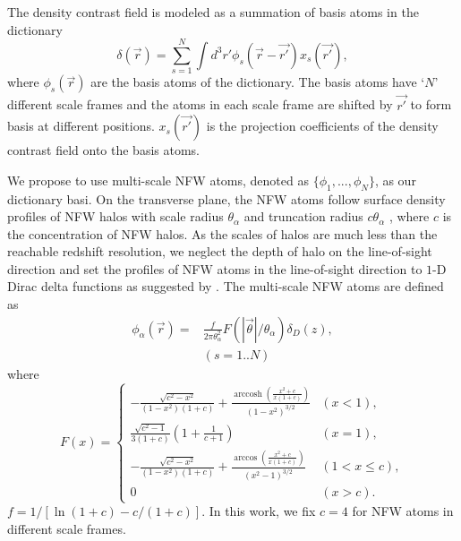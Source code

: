 \documentclass[twocolumn]{aastex62}
\DeclareMathOperator{\arccosh}{arccosh}
\begin{document}
The density contrast field is modeled as a summation of basis atoms in the dictionary 
\begin{equation}\label{eq-x2delta}
\delta(\vec{r}) = \sum_{s=1}^{N} \int d^3 r' \phi_s(\vec{r}-\vec{r'}) x_s(\vec{r'}),
\end{equation}
where $\phi_s(\vec{r})$ are the basis atoms of the dictionary. The basis atoms have `$N$' different scale frames and the atoms
in each scale frame are shifted by $\vec{r'}$ to form basis at different positions. $x_s(\vec{r'})$ is the projection 
coefficients of the density contrast field onto the basis atoms.

We propose to use multi-scale NFW atoms, denoted as $\{\phi_1,...,\phi_N\}$, as our dictionary basi.
On the transverse plane, the NFW atoms follow surface density profiles of NFW halos
\citep{haloModel-TJ2003-3pt} with scale radius $\theta_\alpha$ and truncation radius $c \theta_\alpha$ ,
where $c$ is the concentration of NFW halos.
As the scales of halos are much less than the reachable redshift resolution, we neglect the depth of halo on the
line-of-sight direction and set the profiles of NFW atoms in the line-of-sight direction to $1$-D Dirac delta 
functions as suggested by \citep{LSS-massMap-Glimpse3D-Leonard2014}. 
The multi-scale NFW atoms are defined as
\begin{equation}
\begin{split}
\phi_\alpha(\vec{r}) =&\frac{f }{2 \pi \theta_\alpha^2 } F(|\vec{\theta}|/\theta_\alpha) \delta_D(z),\\
&  (s=1..N)
\end{split}
\end{equation}
where
\begin{equation}
F(x)=
\begin{cases}
-\frac{\sqrt{c^2-x^2}}{(1-x^2)(1+c)} + \frac{\arccosh \left(\frac{x^2+c}{x(1+c)}\right)}{(1-x^2)^{3/2}}  & (x<1),\\
\frac{\sqrt{c^2-1}}{3(1+c)} (1+\frac{1}{c+1}) & (x=1),\\
-\frac{\sqrt{c^2-x^2}}{(1-x^2)(1+c)} + \frac{\arccos\left(\frac{x^2+c}{x(1+c)}\right)}{(x^2-1)^{3/2}} & (1<x\leq c),\\
0& (x>c).
\end{cases}
\end{equation}
$f=1/[\ln (1+c)-c/(1+c)]$. In this work, we fix $c=4$ for NFW atoms in different scale frames.
\end{document}
